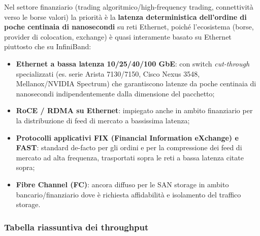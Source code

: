 \documentclass[11pt,a4paper]{article}
\begin{document}
Nel settore finanziario (trading algoritmico/high-frequency trading, connettività verso le borse valori) la priorità è la \textbf{latenza deterministica dell'ordine di poche centinaia di nanosecondi} su reti Ethernet, poiché l'ecosistema (borse, provider di colocation, exchange) è quasi interamente basato su Ethernet piuttosto che su InfiniBand:

\begin{itemize}[nosep]
    \item \textbf{Ethernet a bassa latenza 10/25/40/100 GbE}: con switch \emph{cut-through} specializzati (es. serie Arista 7130/7150, Cisco Nexus 3548, Mellanox/NVIDIA Spectrum) che garantiscono latenze da poche centinaia di nanosecondi indipendentemente dalla dimensione del pacchetto;
    \item \textbf{RoCE / RDMA su Ethernet}: impiegato anche in ambito finanziario per la distribuzione di feed di mercato a bassissima latenza;
    \item \textbf{Protocolli applicativi FIX (Financial Information eXchange) e FAST}: standard de-facto per gli ordini e per la compressione dei feed di mercato ad alta frequenza, trasportati sopra le reti a bassa latenza citate sopra;
    \item \textbf{Fibre Channel (FC)}: ancora diffuso per le SAN storage in ambito bancario/finanziario dove è richiesta affidabilità e isolamento del traffico storage.
\end{itemize}

\subsubsection{Tabella riassuntiva dei throughput}
\end{document}
